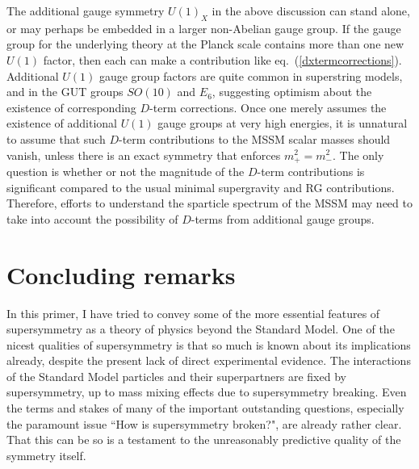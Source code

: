 \documentclass[11pt]{article}
\begin{document}
The additional gauge symmetry $U(1)_X$ in the above discussion can stand
alone, or may perhaps be embedded in a larger non-Abelian gauge group. If
the gauge group for the underlying theory at the Planck scale contains
more than one new $U(1)$ factor, then each can make a contribution like
eq.~(\ref{dxtermcorrections}). Additional $U(1)$ gauge group 
factors are quite
common in superstring models, and in the GUT groups $SO(10)$ and $E_6$, 
suggesting optimism about the existence of
corresponding $D$-term corrections. Once one merely assumes the existence
of additional $U(1)$ gauge groups at very high energies, it is unnatural
to assume that such $D$-term contributions to the MSSM scalar masses
should vanish, unless there is an exact symmetry that enforces $m_+^2 =
m_-^2$. The only question is whether or not the magnitude of the
$D$-term contributions is significant compared to the usual minimal
supergravity and RG contributions. Therefore, efforts to
understand the sparticle spectrum of the MSSM may need to take into
account the possibility of $D$-terms from additional gauge groups. 

\section{Concluding remarks}\label{sec:outlook}
\setcounter{equation}{0}
\setcounter{figure}{0}
\setcounter{table}{0}
\setcounter{footnote}{1}

In this primer, I have tried to convey some of the more essential 
features of supersymmetry as a theory of physics beyond the Standard Model. 
One of the nicest qualities of supersymmetry is that so much is known 
about its implications already, despite the present lack of direct experimental evidence. 
The interactions of the Standard Model particles and their superpartners are 
fixed by supersymmetry, up to mass mixing effects due to supersymmetry 
breaking. Even the terms and stakes of many of the important outstanding 
questions, especially the paramount issue ``How is supersymmetry 
broken?", are already rather clear. That this can be so is a testament 
to the unreasonably predictive quality of the symmetry itself.
\end{document}
